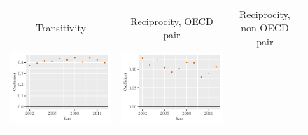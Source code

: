 \documentclass[reqno,onecolumn,letterpaper,12pt]{article}
\begin{document}
\begin{figure}[]
\centering
\begin{tabular}{@{\hskip -.05cm}c@{\hskip -.2cm}c@{\hskip -.2cm}c}
Transitivity  & Reciprocity, OECD pair & Reciprocity, non-OECD pair\\
\includegraphics[height=.165\textheight, clip=true, trim=.5cm .5cm 0cm .1cm]{figures/main_rl_plots/Transitivity.pdf}   &
\includegraphics[height=.165\textheight, clip=true, trim=.5cm .5cm 0cm .1cm]{figures/main_rl_plots/Mutuality_OECD.pdf}    &

\end{tabular}
\end{figure}
\end{document}
